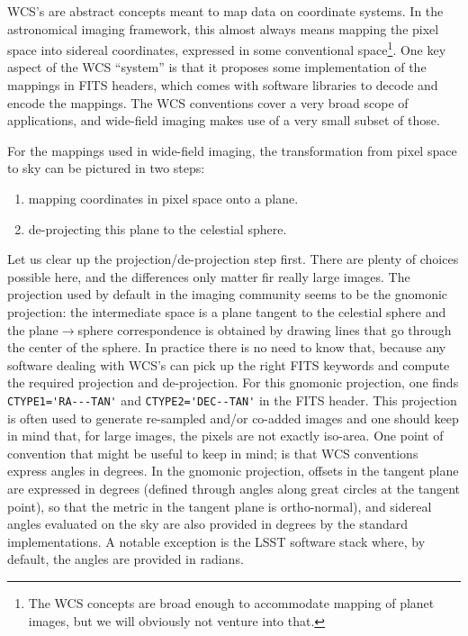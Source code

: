 \documentclass[a4paper,12pt]{scrartcl}
\begin{document}
WCS's are abstract concepts meant to map data on coordinate systems.
In the astronomical imaging framework, this almost always means
mapping the pixel space into sidereal coordinates, expressed in some
conventional space\footnote{The WCS concepts are broad enough to
  accommodate mapping of planet images, but we will obviously not
  venture into that.}. One key aspect of the WCS ``system'' is that
it proposes some implementation of the mappings in FITS headers, which comes
with software libraries to decode and encode the mappings. The WCS conventions
cover a very broad scope of applications, and wide-field imaging
makes use of a very small subset of those. 

For the mappings used in wide-field imaging, the transformation
from pixel space to sky can be pictured in two steps:
\begin{enumerate}
\item mapping coordinates in pixel space onto a plane.
\item de-projecting this plane to the celestial sphere.
\end{enumerate}
Let us clear up the projection/de-projection step first. There are
plenty of choices possible here, and the differences only matter fir
really large images. The projection used by default in the imaging
community seems to be the gnomonic projection: the intermediate space
is a plane tangent to the celestial sphere and the
plane$\rightarrow$sphere correspondence is obtained by drawing lines
that go through the center of the sphere. In practice there is no need
to know that, because any software dealing with WCS's can pick up the
right FITS keywords and compute the required projection and
de-projection.  For this gnomonic projection, one finds
\verb&CTYPE1='RA---TAN'& and \verb&CTYPE2='DEC--TAN'& in the FITS
header. This projection is often used to generate re-sampled and/or
co-added images and one should keep in mind that, for large images,
the pixels are not exactly iso-area.  One point of convention that
might be useful to keep in mind; is that WCS conventions express
angles in degrees. In the gnomonic projection, offsets in the tangent
plane are expressed in degrees (defined through angles along great
circles at the tangent point), so that the metric in the tangent plane
is ortho-normal), and sidereal angles evaluated on the sky are also
provided in degrees by the standard implementations. A notable
exception is the LSST software stack where, by default,
the angles are provided in radians.
\end{document}
